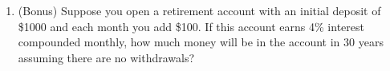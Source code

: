 \documentclass[12pt]{article}
\begin{document}
\begin{enumerate}
\begin{enumerate}
\begin{enumerate}
		\item How long will it take till the balance on the credit card drops below \$1000 purchase assuming no additional purchases are added to the credit card? 
		\vfill
		\item How much in total will have been paid to the credit card company at this point?
		\vfill
		\end{enumerate}
	\item (Bonus) Suppose you open a retirement account with an initial deposit of \$1000 and each month you add \$100. If this account earns 4\% interest compounded monthly, how much money will be in the account in 30 years assuming there are no withdrawals?
	\vfill
	\end{enumerate}

\end{enumerate}
\end{document}
